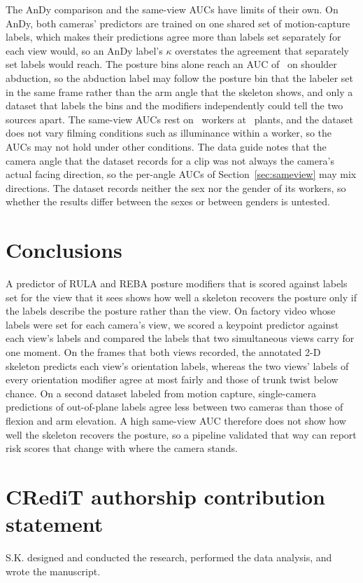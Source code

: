 \documentclass[review,3p,authoryear]{elsarticle}
\begin{document}
The AnDy comparison and the same-view AUCs have limits of their own. On AnDy, both
cameras' predictors are trained on one shared set of motion-capture labels, which makes
their predictions agree more than labels set separately for each view would, so an AnDy
label's $\kappa$ overstates the agreement that separately set labels would reach. The posture bins alone reach an AUC of
\ablBinsUpperarmAbduct\ on shoulder abduction, so the abduction label may follow the
posture bin that the labeler set in the same frame rather than the arm angle that the skeleton shows, and
only a dataset that labels the bins and the modifiers independently could tell the two
sources apart. The same-view AUCs rest on \nSubjects\ workers at \nFactories\ plants, and
the dataset does not vary filming conditions such as illuminance within a worker, so the
AUCs may not hold under other conditions. The data guide notes that the camera angle that the dataset records for a clip was not
always the camera's actual facing direction, so the
per-angle AUCs of Section~\ref{sec:sameview} may mix directions. The dataset records neither the sex nor the
gender of its workers, so whether the results differ between the sexes or between genders is untested.

\section{Conclusions}
\label{sec:conclusions}

A predictor of RULA and REBA posture modifiers that is scored against labels set for the
view that it sees shows how well a skeleton recovers the posture only if the labels
describe the posture rather than the view. On factory video whose labels were set for each
camera's view, we scored a keypoint predictor against each view's labels and compared the
labels that two simultaneous views carry for one moment. On the frames that both views recorded, the annotated 2-D skeleton predicts each view's
orientation labels, whereas the two views' labels of every
orientation modifier agree at most fairly and those of trunk twist below chance. On a
second dataset labeled from motion capture, single-camera predictions of out-of-plane
labels agree less between two cameras than those of flexion and arm elevation. A high
same-view AUC therefore does not show how well the skeleton recovers the posture, so a
pipeline validated that way can report risk scores that change with where the camera
stands.

\section*{CRediT authorship contribution statement}
S.K. designed and conducted the research, performed the data analysis, and wrote the
manuscript.
\end{document}
